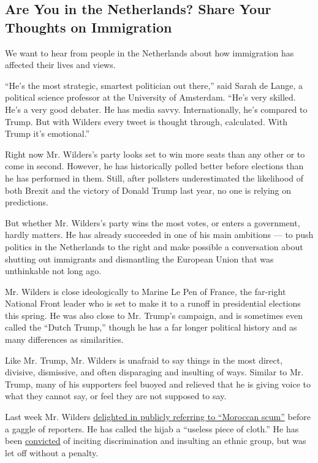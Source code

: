 \hypertarget{are-you-in-the-netherlands-share-your-thoughts-on-immigration}{%
\subsection{Are You in the Netherlands? Share Your Thoughts on
Immigration}\label{are-you-in-the-netherlands-share-your-thoughts-on-immigration}}

We want to hear from people in the Netherlands about how immigration has
affected their lives and views.

``He's the most strategic, smartest politician out there,'' said Sarah
de Lange, a political science professor at the University of Amsterdam.
``He's very skilled. He's a very good debater. He has media savvy.
Internationally, he's compared to Trump. But with Wilders every tweet is
thought through, calculated. With Trump it's emotional.''

Right now Mr. Wilders's party looks set to win more seats than any other
or to come in second. However, he has historically polled better before
elections than he has performed in them. Still, after pollsters
underestimated the likelihood of both Brexit and the victory of Donald
Trump last year, no one is relying on predictions.

But whether Mr. Wilders's party wins the most votes, or enters a
government, hardly matters. He has already succeeded in one of his main
ambitions --- to push politics in the Netherlands to the right and make
possible a conversation about shutting out immigrants and dismantling
the European Union that was unthinkable not long ago.

Mr. Wilders is close ideologically to Marine Le Pen of France, the
far-right National Front leader who is set to make it to a runoff in
presidential elections this spring. He was also close to Mr. Trump's
campaign, and is sometimes even called the ``Dutch Trump,'' though he
has a far longer political history and as many differences as
similarities.

Like Mr. Trump, Mr. Wilders is unafraid to say things in the most
direct, divisive, dismissive, and often disparaging and insulting of
ways. Similar to Mr. Trump, many of his supporters feel buoyed and
relieved that he is giving voice to what they cannot say, or feel they
are not supposed to say.

Last week Mr. Wilders
\href{https://www.nytimes.com/2017/02/18/world/europe/geert-wilders-netherlands-freedom-party-moroccan-immigrants.html?rref=collection\%2Ftimestopic\%2FWilders\%2C\%20Geert\&action=click\&contentCollection=timestopics\&region=stream\&module=stream_unit\&version=latest\&contentPlacement=1\&pgtype=collection\&_r=0}{delighted
in publicly referring to ``Moroccan scum''} before a gaggle of
reporters. He has called the hijab a ``useless piece of cloth.'' He has
been
\href{https://www.nytimes.com/2016/12/09/world/europe/geert-wilders-netherlands-trial.html}{convicted}
of inciting discrimination and insulting an ethnic group, but was let
off without a penalty.


